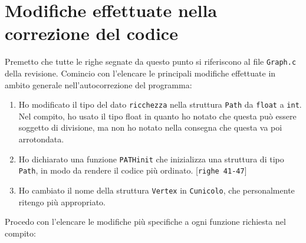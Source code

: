 \documentclass[a4paper]{article}
\newcommand{\code}[1]{\texttt{#1}}
\newcommand{\righe}[1]{[\code{righe #1}]}
\begin{document}
    \section{Modifiche effettuate nella correzione del codice}
    Premetto che tutte le righe segnate da questo punto si riferiscono al file \code{Graph.c} della revisione. Comincio con l'elencare le principali modifiche effettuate in ambito generale nell'autocorrezione del programma:
    \begin{enumerate}
        \item Ho modificato il tipo del dato \code{ricchezza} nella struttura \code{Path} da \code{float} a \code{int}. Nel compito, ho usato il tipo float in quanto ho notato che questa può essere soggetto di divisione, ma non ho notato nella consegna che questa va poi arrotondata.
        \item Ho dichiarato una funzione \code{PATHinit} che inizializza una struttura di tipo \code{Path}, in modo da rendere il codice più ordinato. \righe{41-47}
        \item Ho cambiato il nome della struttura \code{Vertex} in \code{Cunicolo}, che personalmente ritengo più appropriato.
    \end{enumerate}
    Procedo con l'elencare le modifiche più specifiche a ogni funzione richiesta nel compito:
\end{document}

